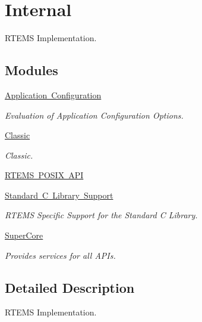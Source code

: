\hypertarget{group__RTEMSInternal}{}\section{Internal}
\label{group__RTEMSInternal}


R\+T\+E\+MS Implementation.  


\subsection*{Modules}
\begin{DoxyCompactItemize}
\item 
\mbox{\hyperlink{group__RTEMSApplicationConfiguration}{Application Configuration}}
\begin{DoxyCompactList}\small\item\em Evaluation of Application Configuration Options. \end{DoxyCompactList}\item 
\mbox{\hyperlink{group__RTEMSInternalClassic}{Classic}}
\begin{DoxyCompactList}\small\item\em Classic. \end{DoxyCompactList}\item 
\mbox{\hyperlink{group__POSIXAPI}{R\+T\+E\+M\+S P\+O\+S\+I\+X A\+PI}}
\item 
\mbox{\hyperlink{group__libcsupport}{Standard C Library Support}}
\begin{DoxyCompactList}\small\item\em R\+T\+E\+MS Specific Support for the Standard C Library. \end{DoxyCompactList}\item 
\mbox{\hyperlink{group__RTEMSScore}{Super\+Core}}
\begin{DoxyCompactList}\small\item\em Provides services for all A\+P\+Is. \end{DoxyCompactList}\end{DoxyCompactItemize}


\subsection{Detailed Description}
R\+T\+E\+MS Implementation. 

